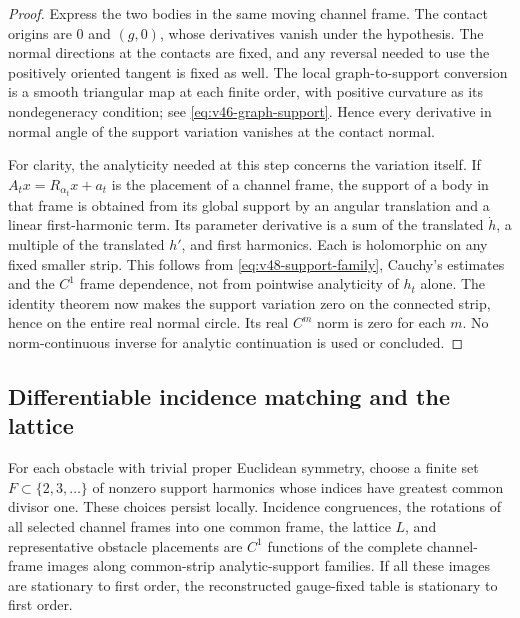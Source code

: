 \begin{proof}
Express the two bodies in the same moving channel frame.  The contact
origins are $0$ and $(g,0)$, whose derivatives vanish under the hypothesis.
The normal directions at the contacts are fixed, and any reversal
needed to use the positively oriented tangent is fixed as well.
The local graph-to-support conversion is a smooth triangular map at
each finite order, with positive curvature as its nondegeneracy
condition; see \eqref{eq:v46-graph-support}.  Hence every derivative in
normal angle of the support variation vanishes at the contact normal.

For clarity, the analyticity needed at this step concerns the variation
itself.  If $A_t x=R_{\alpha_t}x+a_t$ is the placement of a channel frame,
the support of a body in that frame is obtained from its global support
by an angular translation and a linear first-harmonic term.  Its
parameter derivative is a sum of the translated $\dot h$, a multiple
of the translated $h'$, and first harmonics.  Each is holomorphic on
any fixed smaller strip.  This follows from
\eqref{eq:v48-support-family}, Cauchy's estimates and the $C^1$
frame dependence, not from pointwise analyticity of $h_t$ alone.
The identity theorem now makes the support variation zero on the
connected strip, hence on the entire real normal circle.  Its real
$C^m$ norm is zero for each $m$.  No norm-continuous inverse for
analytic continuation is used or concluded.
\end{proof}

\subsection{Differentiable incidence matching and the lattice}

\begin{lemma}
\label{lem:v48-registration}
For each obstacle with trivial proper Euclidean symmetry, choose a
finite set $F\subset\{2,3,\ldots\}$ of nonzero support harmonics whose
indices have greatest common divisor one.  These choices persist
locally.  Incidence congruences, the rotations of all selected channel
frames into one common frame, the lattice $L$, and representative obstacle
placements are $C^1$ functions of the complete channel-frame images
along common-strip analytic-support families.  If all these images are
stationary to first order, the reconstructed gauge-fixed table is
stationary to first order.
\end{lemma}

